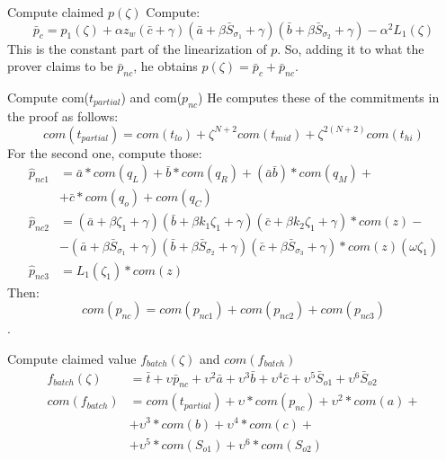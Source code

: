 \documentclass{zkdl-presentation-template}
\begin{document}
    \begin{frame} {Compute claimed $p(\zeta)$}
        Compute: 
        \[\bar{p}_c = p_1(\zeta) + \alpha z_{w} \left( \bar{c} + \gamma \right) \left( \bar{a} + \beta \bar{S}_{\sigma_1} + \gamma \right) \left( \bar{b} + \beta \bar{S}_{\sigma_2} + \gamma \right) - \alpha^2 L_1(\zeta)\]
        This is the constant part of the linearization of $p$. So, adding it to what the prover claims to be $\bar{p}_{nc}$, he obtains $p(\zeta) = \bar{p}_c + \bar{p}_{nc}$.
    \end{frame}

    \begin{frame} {Compute com($t_{partial}$) and com($p_{nc}$)}
        He computes these of the commitments in the proof as follows:
        \[com(t_{partial}) = com(t_{lo}) + \zeta^{N+2}com(t_{mid}) + \zeta^{2(N+2)}com(t_{hi})\]
        For the second one, compute those:
        \begin{align*}
            \hat{p}_{nc1} &= \bar{a} * com(q_L) + \bar{b} * com(q_R) + (\bar{a}\bar{b}) * com(q_M) +  \\
                        &+ \bar{c} * com(q_o) + com(q_C) \\
            \hat{p}_{nc2} &= (\bar{a} + \beta \zeta_1 + \gamma)(\bar{b} + \beta k_1 \zeta_1 + \gamma)(\bar{c} + \beta k_2 \zeta_1 + \gamma) * com(z) - \\ 
            &- (\bar{a} + \beta \bar{S}_{\sigma_1} + \gamma)(\bar{b} + \beta \bar{S}_{\sigma_2} + \gamma)(\bar{c} + \beta \bar{S}_{\sigma_3} + \gamma) * com(z)(\omega \zeta_1) \\
            \hat{p}_{nc3} &= L_1(\zeta_1) * com(z)
        \end{align*}
        Then: \[com(p_{nc}) = com(p_{nc1}) + com(p_{nc2}) + com(p_{nc3})\].
    \end{frame}

    \begin{frame} {Compute claimed value $f_{batch}(\zeta)$ and $com(f_{batch})$}
        \begin{align*}
            f_{batch}(\zeta) &= \bar{t} + \upsilon \bar{p}_{nc} + \upsilon^2 \bar{a} + \upsilon^3 \bar{b} + \upsilon^4 \bar{c} + \upsilon^5 \bar{S}_{o1} + \upsilon^6 \bar{S}_{o2} \\
            com(f_{batch}) &= com(t_{partial}) + \upsilon * com(p_{nc}) + \upsilon^2 * com(a) + \\
            &+ \upsilon^3 * com(b) + \upsilon^4 * com(c) + \\
            &+ \upsilon^5 * com(S_{o1}) + \upsilon^6 * com(S_{o2})
        \end{align*}
    \end{frame}
\end{document}

